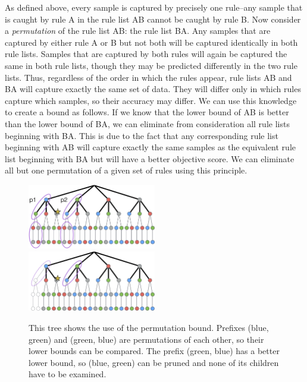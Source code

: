 As defined above, every sample is captured by precisely one rule--any sample that is caught by rule A in the rule list AB cannot be caught by rule B. 
Now consider a \textit{permutation} of the rule list AB: the rule list BA.
Any samples that are captured by either rule A or B but not both will be captured identically in both rule lists.
Samples that are captured by both rules will again be captured the same in both rule lists, though they may be predicted differently in the two rule lists.
Thus, regardless of the order in which the rules appear, rule lists AB and BA will capture exactly the same set of data.
They will differ only in which rules capture which samples, so their accuracy may differ. 
We can use this knowledge to create a bound as follows.
If we know that the lower bound of AB is better than the lower bound of BA, we can eliminate from consideration all rule lists beginning with BA.
This is due to the fact that any corresponding rule list beginning with AB will capture exactly the same samples as the equivalent rule list beginning with BA but will have a better objective score.
We can eliminate all but one permutation of a given set of rules using this principle.

\begin{figure}
\includegraphics[width=0.5\textwidth]{figs/ela_branch-and-bound-permutations.png}
\includegraphics[width=0.5\textwidth]{figs/ela_branch-and-bound-permutations-pruned.png}
\caption[Permutation bound]{This tree shows the use of the permutation bound. Prefixes (blue, green) and (green, blue) are permutations of each other, so their lower bounds can be compared. The prefix (green, blue) has a better lower bound, so (blue, green) can be pruned and none of its children have to be examined.
\label{fig:permutation-bound}}
\end{figure}

